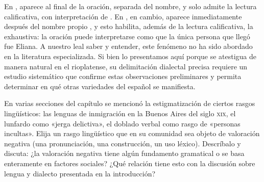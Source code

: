 En ,  aparece al final de la oración, separada
del nombre, y solo admite la lectura calificativa, con interpretación de
. En , en cambio,  aparece
inmediatamente después del nombre propio , y esto habilita, además
de la lectura calificativa, la exhaustiva: la oración puede interpretarse como que
la única persona que llegó fue Eliana. A nuestro leal saber y entender, este
fenómeno no ha sido abordado en la literatura especializada. Si bien lo
presentamos aquí porque se atestigua de manera natural en el rioplatense, su
delimitación dialectal precisa requiere un estudio sistemático que confirme estas
observaciones preliminares y permita determinar en qué otras variedades del
español se manifiesta.

\begin{ejercicio}\label{ej:15-estigma}
En varias secciones del capítulo se mencionó la estigmatización de ciertos rasgos
lingüísticos: las lenguas de inmigración en la Buenos Aires del siglo
\textsc{xix}, el lunfardo como «jerga delictiva», el doblado verbal como rasgo de
«personas incultas». Elija un rasgo lingüístico que en su comunidad sea objeto de
valoración negativa (una pronunciación, una construcción, un uso léxico).
Descríbalo y discuta: ¿la valoración negativa tiene algún fundamento gramatical o
se basa enteramente en factores sociales? ¿Qué relación tiene esto con la
discusión sobre lengua y dialecto presentada en la introducción?
\end{ejercicio}

